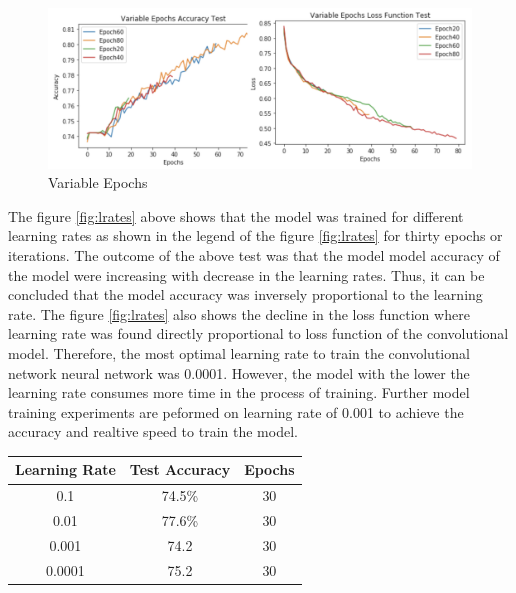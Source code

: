 \begin{figure}[!htp]
    \centering
    \includegraphics[width=15cm]{Images/epochs.png}
    \caption{Variable Epochs}
    \label{fig:epochs}
\end{figure}

The figure \ref{fig:lrates} above shows that the model was trained for different learning rates as shown
in the legend of the figure \ref{fig:lrates} for thirty epochs or iterations. The outcome of the above test 
was that the model model accuracy of the model were increasing with decrease in the learning rates. Thus, it 
can be concluded that the model accuracy was  inversely proportional to the learning rate. The figure \ref{fig:lrates} also shows the 
decline in the loss function where learning rate was found directly proportional to loss function of the 
convolutional model. Therefore, the most optimal learning rate to train the convolutional network 
neural network was 0.0001. However, the model with the lower the learning rate consumes more time in the 
process of training. Further model training experiments are peformed on 
learning rate of 0.001 to achieve the accuracy and realtive speed to train the model.
\pagebreak

\begin{center}
    \begin{tabular} {| c | c | c |}
        \hline
        Learning Rate & Test Accuracy & Epochs \\ 
        \hline
        0.1 & 74.5\% & 30 \\ 
        \hline 
        0.01 & 77.6\% & 30  \\
        \hline 
        0.001 & 74.2 & 30  \\
        \hline
        0.0001 & 75.2 & 30  \\
        \hline
    \end{tabular}
\end{center}

